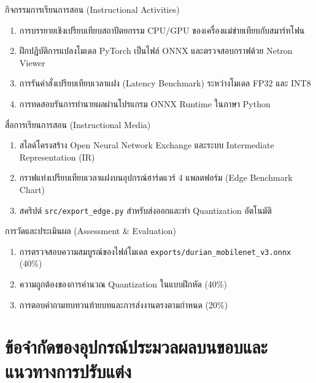 \begin{planbox}{กิจกรรมการเรียนการสอน (Instructional Activities)}
\begin{enumerate}[leftmargin=1.5em, itemsep=2pt]
    \item การบรรยายเชิงเปรียบเทียบสถาปัตยกรรม CPU/GPU ของเครื่องแม่ข่ายเทียบกับสมาร์ทโฟน
    \item ฝึกปฏิบัติการแปลงโมเดล PyTorch เป็นไฟล์ ONNX และตรวจสอบกราฟด้วย Netron Viewer
    \item การรันคำสั่งเปรียบเทียบเวลาแฝง (Latency Benchmark) ระหว่างโมเดล FP32 และ INT8
    \item การทดสอบรันการทำนายผลผ่านโปรแกรม ONNX Runtime ในภาษา Python
\end{enumerate}
\end{planbox}

\begin{planbox}{สื่อการเรียนการสอน (Instructional Media)}
\begin{enumerate}[leftmargin=1.5em, itemsep=2pt]
    \item สไลด์โครงสร้าง Open Neural Network Exchange และระบบ Intermediate Representation (IR)
    \item กราฟแท่งเปรียบเทียบเวลาแฝงบนอุปกรณ์ฮาร์ดแวร์ 4 แพลตฟอร์ม (Edge Benchmark Chart)
    \item สคริปต์ \texttt{src/export\_edge.py} สำหรับส่งออกและทำ Quantization อัตโนมัติ
\end{enumerate}
\end{planbox}

\begin{planbox}{การวัดและประเมินผล (Assessment \& Evaluation)}
\begin{enumerate}[leftmargin=1.5em, itemsep=2pt]
    \item การตรวจสอบความสมบูรณ์ของไฟล์โมเดล \texttt{exports/durian\_mobilenet\_v3.onnx} (40\%)
    \item ความถูกต้องของการคำนวณ Quantization ในแบบฝึกหัด (40\%)
    \item การตอบคำถามทบทวนท้ายบทและการส่งงานตรงตามกำหนด (20\%)
\end{enumerate}
\end{planbox}

\clearpage

\section{ข้อจำกัดของอุปกรณ์ประมวลผลบนขอบและแนวทางการปรับแต่ง}

